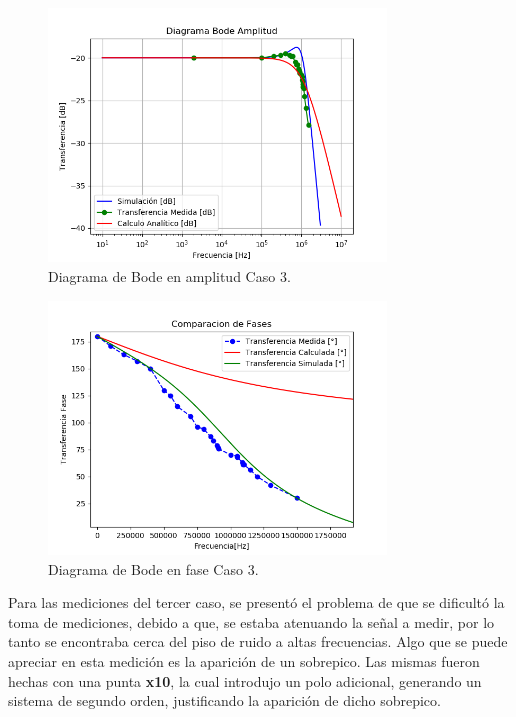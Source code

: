 \begin{figure}[H]	
	\centering
	\includegraphics[width=0.8\textwidth]{Ejercicio1/Imagenes/BodeC3.png}
	\caption{Diagrama de Bode en amplitud Caso 3.}
	\label{fig:BodeC3}
\end{figure} 
\begin{figure}[H]	
	\centering
	\includegraphics[width=0.8\textwidth]{Ejercicio1/Imagenes/BodephC3.png}
	\caption{Diagrama de Bode en fase Caso 3.}
	\label{fig:BodephC3}
\end{figure} 

Para las mediciones del tercer caso, se presentó el problema de que se dificultó la toma de mediciones, debido a que, se estaba atenuando la señal a medir, por lo tanto se encontraba cerca del piso de ruido a altas frecuencias. Algo que se puede apreciar en esta medición es la aparición de un sobrepico. Las mismas fueron hechas con una punta \textbf{x10}, la cual introdujo un polo adicional, generando un sistema de segundo orden, justificando la aparición de dicho sobrepico.

